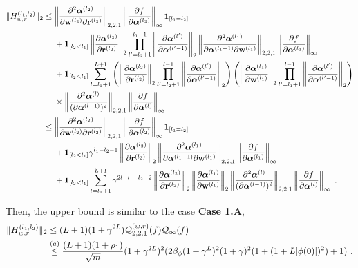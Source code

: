 \begin{align*}
\| H_{w,r}^{(l_1,l_2)} \|_2 
& \leq  \left\| \frac{\partial^2 \boldsymbol{\alpha}^{(l_2)}}{\partial \mathbf{w}^{(l_2)}  \partial \mathbf{r}^{(l_2)}} \right\|_{2,2,1} \left\| \frac{\partial f}{\partial \boldsymbol{\alpha}^{(l_2)}} \right\|_{\infty} \bm{1}_{[l_1=l_2]}\\
& ~~~~ + \bm{1}_{[l_2 <l_1]} \left\| \frac{\partial \boldsymbol{\alpha}^{(l_2)}}{\partial \mathbf{r}^{(l_2)}} \right\|_2 \prod_{l'=l_2+1}^{l_1-1} \left\| \frac{\partial \boldsymbol{\alpha}^{(l')}}{\partial \boldsymbol{\alpha}^{(l'-1)}} \right\|_2 \left\| \frac{\partial^2 \boldsymbol{\alpha}^{(l_1)}}{\partial \boldsymbol{\alpha}^{(l_1-1)} \partial \mathbf{w}^{(l_1)}} \right\|_{2,2,1} \left\| \frac{\partial f}{\partial \boldsymbol{\alpha}^{(l_1)}} \right\|_{\infty} \\
& ~~~~ + \bm{1}_{[l_2 <l_1]}\sum_{l=l_1+1}^{L+1} \left( \left\| \frac{\partial \boldsymbol{\alpha}^{(l_2)}}{\partial \mathbf{r}^{(l_2)}} \right\|_2  \prod_{l'=l_2+1}^{l-1} \left\| \frac{\partial \boldsymbol{\alpha}^{(l')}}{\partial \boldsymbol{\alpha}^{(l'-1)}} \right\|_2 \right)  \left( \left\| \frac{\partial \boldsymbol{\alpha}^{(l_1)}}{\partial \mathbf{w}^{(l_1)}} \right\|_2 \prod_{l'=l_1+1}^{l-1} \left\| \frac{\partial \boldsymbol{\alpha}^{(l')}}{\partial \boldsymbol{\alpha}^{(l'-1)}} \right\|_{2} \right)\\
& ~~~~ \times \left\| \frac{\partial^2 \boldsymbol{\alpha}^{(l)}}{(\partial \boldsymbol{\alpha}^{(l-1)})^2} \right\|_{2,2,1} \left\| \frac{\partial f}{\partial \boldsymbol{\alpha}^{(l)}} \right\|_{\infty} \\
& \leq  \left\| \frac{\partial^2 \boldsymbol{\alpha}^{(l_2)}}{\partial \mathbf{w}^{(l_2)}  \partial \mathbf{r}^{(l_2)}} \right\|_{2,2,1} \left\| \frac{\partial f}{\partial \boldsymbol{\alpha}^{(l_2)}} \right\|_{\infty} \bm{1}_{[l_1 =l_2]}\\
& ~~~~ + \bm{1}_{[l_2 <l_1]} \gamma^{l_1-l_2-1} \left\| \frac{\partial \boldsymbol{\alpha}^{(l_2)}}{\partial \mathbf{r}^{(l_2)}} \right\|_2 \left\| \frac{\partial^2 \boldsymbol{\alpha}^{(l_1)}}{\partial \boldsymbol{\alpha}^{(l_1-1)} \partial \mathbf{w}^{(l_1)}} \right\|_{2,2,1} \left\| \frac{\partial f}{\partial \boldsymbol{\alpha}^{(l_1)}} \right\|_{\infty} \\
& ~~~~ + \bm{1}_{[l_2 <l_1]}\sum_{l=l_1+1}^{L+1} \gamma^{2l - l_1 - l_2-2} \left\| \frac{\partial \boldsymbol{\alpha}^{(l_2)}}{\partial \mathbf{r}^{(l_2)}} \right\|_2  \left\| \frac{\partial \boldsymbol{\alpha}^{(l_1)}}{\partial \mathbf{w}^{(l_1)}} \right\|_2  \left\| \frac{\partial^2 \boldsymbol{\alpha}^{(l)}}{(\partial \boldsymbol{\alpha}^{(l-1)})^2} \right\|_{2,2,1} \left\| \frac{\partial f}{\partial \boldsymbol{\alpha}^{(l)}} \right\|_{\infty} ~.
\end{align*}

Then, the upper bound is similar to the case {\bf Case 1.A},
\begin{align*}
 \| H_{w,r}^{(l_1,l_2)} \|_2 &\leq (L+1)(1+\gamma^{2L}) {\cal Q}^{(w,r)}_{2,2,1}(f) {\cal Q}_{\infty}(f)\\
 &\overset{(a)}{\leq}
 \frac{(L+1)(1+\rho_1)}{\sqrt{m}}(1+\gamma^{2L})^2(2\beta_{\phi}(1+\gamma^L)^2(1+\gamma)^2(1+(1+L|\phi(0)|)^2)+1)
 ~.
\end{align*}

